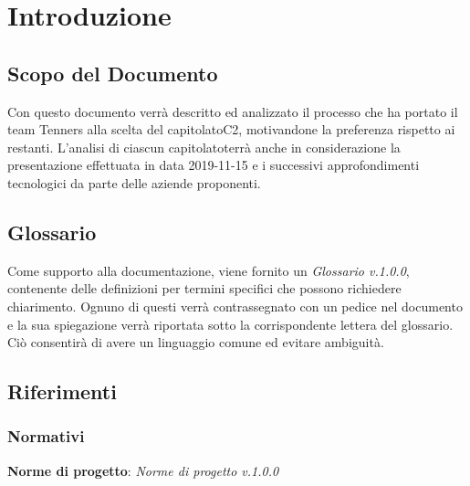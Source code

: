 \section{Introduzione}

\subsection{Scopo del Documento}
Con questo documento verrà descritto ed analizzato il processo che ha portato il team Tenners alla scelta del capitolato\glo C2, motivandone la preferenza rispetto ai restanti. L'analisi di ciascun capitolato\glo terrà anche in considerazione la presentazione effettuata in data 2019-11-15 e i successivi approfondimenti tecnologici da parte delle aziende proponenti.
	
\subsection{Glossario}
Come supporto alla documentazione, viene fornito un \textit{Glossario v.1.0.0}, contenente delle definizioni per termini specifici che possono richiedere chiarimento. Ognuno di questi verrà contrassegnato con un pedice \glo nel documento e la sua spiegazione verrà riportata sotto la corrispondente lettera del glossario. Ciò consentirà di avere un linguaggio comune ed evitare ambiguità. 
	
\subsection{Riferimenti}
\subsubsection{Normativi}
\textbf{Norme di progetto}: \textit{Norme di progetto v.1.0.0}

